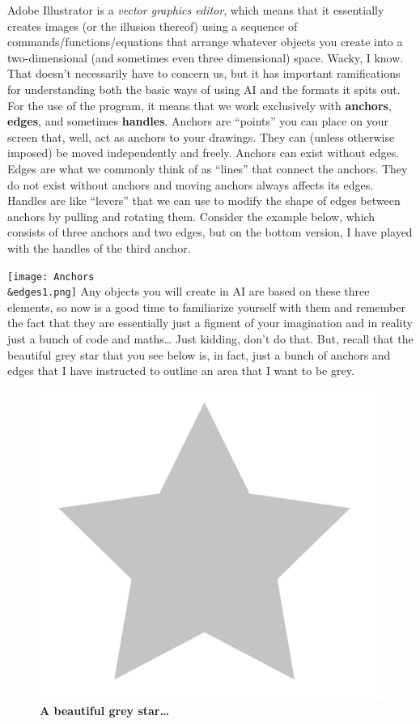 \documentclass[]{article}
\begin{document}
Adobe Illustrator is a \emph{vector graphics editor}, which means that
it essentially creates images (or the illusion thereof) using a sequence
of commands/functions/equations that arrange whatever objects you create
into a two-dimensional (and sometimes even three dimensional) space.
Wacky, I know. That doesn't necessarily have to concern us, but it has
important ramifications for understanding both the basic ways of using
AI and the formats it spits out. For the use of the program, it means
that we work exclusively with \textbf{anchors}, \textbf{edges}, and
sometimes \textbf{handles}. Anchors are ``points'' you can place on your
screen that, well, act as anchors to your drawings. They can (unless
otherwise imposed) be moved independently and freely. Anchors can exist
without edges. Edges are what we commonly think of as ``lines'' that
connect the anchors. They do not exist without anchors and moving
anchors always affects its edges. Handles are like ``levers'' that we
can use to modify the shape of edges between anchors by pulling and
rotating them. Consider the example below, which consists of three
anchors and two edges, but on the bottom version, I have played with the
handles of the third anchor.

\texttt{[image: Anchors\\\&edges1.png]} Any objects you will create in AI
are based on these three elements, so now is a good time to familiarize
yourself with them and remember the fact that they are essentially just
a figment of your imagination and in reality just a bunch of code and
maths\ldots{} Just kidding, don't do that. But, recall that the
beautiful grey star that you see below is, in fact, just a bunch of
anchors and edges that I have instructed to outline an area that I want
to be grey.

\begin{figure}
\centering
\includegraphics{Star1.png}
\caption{\textbf{A beautiful grey star\ldots{}}}
\end{figure}
\end{document}
